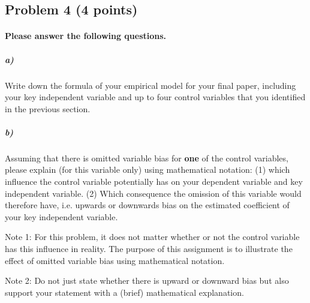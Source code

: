 \documentclass[12pt]{article}
\begin{document}
\subsection*{Problem 4 (4 points)}

\paragraph{Please answer the following questions.}

\subparagraph{a)} Write down the formula of your empirical model for your final paper, including your key independent variable and up to four control variables that you identified in the previous section.

\subparagraph{b)} Assuming that there is omitted variable bias for \textbf{one} of the control variables, please explain (for this variable only) using mathematical notation: (1) which influence the control variable potentially has on your dependent variable and key independent variable. (2) Which consequence the omission of this variable would therefore have, i.e. upwards or downwards bias on the estimated coefficient of your key independent variable.

Note 1: For this problem, it does not matter whether or not the control variable has this influence in reality. The purpose of this assignment is to illustrate the effect of omitted variable bias using mathematical notation.

Note 2: Do not just state whether there is upward or downward bias but also support your statement with a (brief) mathematical explanation.
\end{document}
